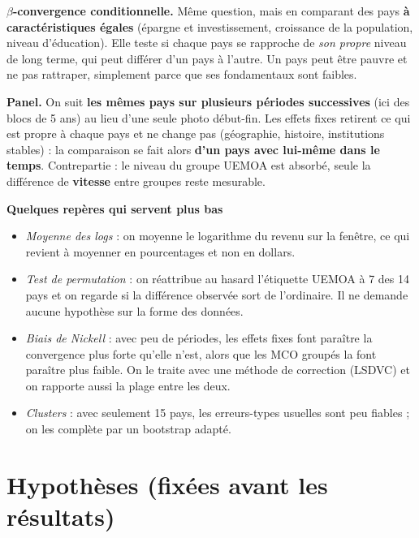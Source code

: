 \documentclass[14pt,a4paper]{article}
\newcommand{\bet}{\texorpdfstring{$\beta$}{beta}}
\begin{document}
	\textbf{\boldmath\bet-convergence conditionnelle.} Même question, mais en comparant des pays \textbf{à caractéristiques égales} (épargne et investissement, croissance de la population, niveau d'éducation). Elle teste si chaque pays se rapproche de \textit{son propre} niveau de long terme, qui peut différer d'un pays à l'autre. Un pays peut être pauvre et ne pas rattraper, simplement parce que ses fondamentaux sont faibles.
	
	\textbf{Panel.} On suit \textbf{les mêmes pays sur plusieurs périodes successives} (ici des blocs de 5 ans) au lieu d'une seule photo début-fin. Les effets fixes retirent ce qui est propre à chaque pays et ne change pas (géographie, histoire, institutions stables) : la comparaison se fait alors \textbf{d'un pays avec lui-même dans le temps}. Contrepartie : le niveau du groupe UEMOA est absorbé, seule la différence de \textbf{vitesse} entre groupes reste mesurable.
	
	\textbf{Quelques repères qui servent plus bas}
	\begin{itemize}
		\item \textit{Moyenne des logs} : on moyenne le logarithme du revenu sur la fenêtre, ce qui revient à moyenner en pourcentages et non en dollars.
		\item \textit{Test de permutation} : on réattribue au hasard l'étiquette UEMOA à 7 des 14 pays et on regarde si la différence observée sort de l'ordinaire. Il ne demande aucune hypothèse sur la forme des données.
		\item \textit{Biais de Nickell} : avec peu de périodes, les effets fixes font paraître la convergence plus forte qu'elle n'est, alors que les MCO groupés la font paraître plus faible. On le traite avec une méthode de correction (LSDVC) et on rapporte aussi la plage entre les deux.
		\item \textit{Clusters} : avec seulement 15 pays, les erreurs-types usuelles sont peu fiables ; on les complète par un bootstrap adapté.
	\end{itemize}
	
	\section{Hypothèses (fixées avant les résultats)}
	
\end{document}
